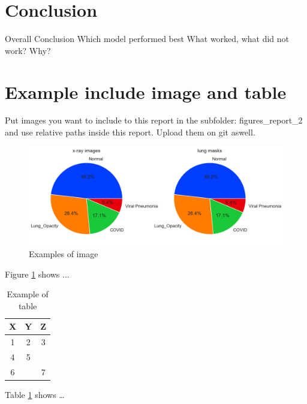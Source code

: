 \documentclass{article}
\begin{document}
\section{Conclusion}
Overall Conclusion
Which model performed best
What worked, what did not work? Why?

\section{Example include image and table}

Put images you want to include to this report in the subfolder: figures\_report\_2 and use relative paths inside this report.
Upload them on git aswell.

\begin{figure}[ht] %
    \centering
    \includegraphics[width=1.0\linewidth]{../figures/figures_report_2/classes.png}
    \caption{Examples of image}
    \label{fig:example_image}
\end{figure}

Figure \ref{fig:example_image} shows ...


\begin{table}[h]
    \centering
    \begin{tabular}{|c|c|c|}
        \hline
        \textbf{X} & \textbf{Y} & \textbf{Z} \\ \hline
        1 & 2 & 3 \\ \hline
        4 & 5 &  \\ \hline \hline
        6 &  & 7 \\ \hline
    \end{tabular}
    \caption{Example of table}
    \label{tab:example_table}
\end{table}

Table \ref{tab:example_table} shows \dots
\end{document}
